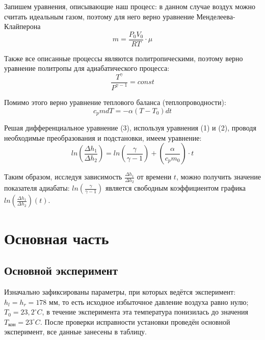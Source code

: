 \documentclass[a4paper,14pt]{article}
\begin{document}
Запишем уравнения, описывающие наш процесс: в данном случае воздух можно считать идеальным газом, поэтому для него верно уравнение Менделеева-Клайперона \begin{equation}
m = \frac{P_0 V_0}{RT} \cdot \mu
\end{equation}

Также все описанные процессы являются политропическими, поэтому верно уравнение политропы для адиабатического процесса: \begin{equation}
\frac{T^{\gamma}}{P^{\gamma - 1}} = const
\end{equation}

Помимо этого верно уравнение теплового баланса (теплопроводности): \begin{equation}
c_p m dT = -\alpha(T-T_0)dt
\end{equation}

Решая дифференциальное уравнение (3), используя уравнения (1) и (2), проводя необходимые преобразования и подстановки, имеем уравнение: \begin{equation}
ln\left(\frac{\Delta h_1}{\Delta h_2}\right) = ln\left(\frac{\gamma}{\gamma - 1}\right) + \left(\frac{\alpha}{c_p m_0}\right) \cdot t
\end{equation}

Таким образом, исследуя зависимость $\frac{\Delta h_1}{\Delta h_2}$ от времени $t$, можно получить значение показателя адиабаты: $ln\left(\frac{\gamma}{\gamma - 1}\right)$ является свободным коэффициентом графика $ln\left(\frac{\Delta h_1}{\Delta h_2}\right) (t)$.
\newpage

\section{Основная часть}
\subsection{Основной эксперимент}

Изначально зафиксированы параметры, при которых ведётся эксперимент: $h_l = h_r = 178$ мм, то есть исходное избыточное давление воздуха равно нулю; $T_0 = 23,2^{\circ}C$, в течение эксперимента эта температура понизилась до значения $T_{\text{кон}} = 23^{\circ}C$. После проверки исправности установки проведён основной эксперимент, все данные занесены в таблицу.
\end{document}
